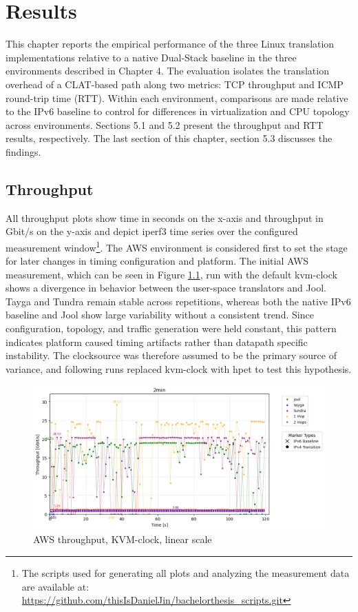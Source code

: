 \chapter{Results}
This chapter reports the empirical performance of the three Linux translation implementations relative to a native Dual-Stack baseline in the three environments described in Chapter 4. The evaluation isolates the translation overhead of a CLAT-based path along two metrics: TCP throughput and ICMP round-trip time (RTT). Within each environment, comparisons are made relative to the IPv6 baseline to control for differences in virtualization and CPU topology across environments. Sections 5.1 and 5.2 present the throughput and RTT results, respectively. The last section of this chapter, section 5.3 discusses the findings.

\section{Throughput}
All throughput plots show time in seconds on the x-axis and throughput in Gbit/s on the y-axis and depict iperf3 time series over the configured measurement window\footnote{The scripts used for generating all plots and analyzing the measurement data are available at: \url{https://github.com/thisIsDanielJin/bachelorthesis_scripts.git}}. The AWS environment is considered first to set the stage for later changes in timing configuration and platform.
The initial AWS measurement, which can be seen in Figure \ref{fig:AWS_tcp_sameScale_kvm-clock_linear}, run with the default kvm-clock shows a divergence in behavior between the user-space translators and Jool. Tayga and Tundra remain stable across repetitions, whereas both the native IPv6 baseline and Jool show large variability without a consistent trend. Since configuration, topology, and traffic generation were held constant, this pattern indicates platform caused timing artifacts rather than datapath specific instability. The clocksource was therefore assumed to be the primary source of variance, and following runs replaced kvm-clock with hpet to test this hypothesis.

\begin{figure}[H]
    \centering
    \includegraphics[width=1\textwidth]{resources/finalPlots/combinedplots/AWS_tcp_sameScale_kvm-clock_2min_linear.png}
    \caption{AWS throughput, KVM-clock, linear scale}
    \label{fig:AWS_tcp_sameScale_kvm-clock_linear}

\end{figure}

